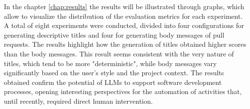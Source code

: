  In the chapter \ref{chap:results} the results will be illustrated through graphs, which allow to visualize the distribution of the evaluation metrics for each experiment. A total of eight experiments were conducted, divided into four configurations for generating descriptive titles and four for generating body messages of pull requests. The results highlight how the generation of titles obtained higher scores than the body messages. This result seems consistent with the very nature of titles, which tend to be more "deterministic", while body messages vary significantly based on the user's style and the project context. The results obtained confirm the potential of LLMs to support software development processes, opening interesting perspectives for the automation of activities that, until recently, required direct human intervention.